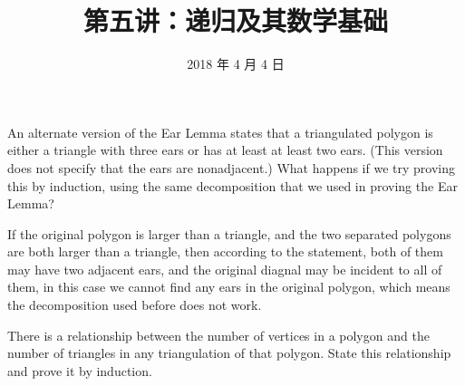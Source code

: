 \documentclass[11pt, a4paper, UTF8]{ctexart}
\title{第五讲：递归及其数学基础}
\date{2018 年 4 月 4 日}     %
\begin{document}
\maketitle
\noplagiarism	%
\beginthishw	%

\begin{problem}[CS: 4.1.16]	%
  An alternate version of the Ear Lemma states that a triangulated polygon 
  is either a triangle with three ears or has at least at least two ears.
  (This version does not specify that the ears are nonadjacent.) What happens 
  if we try proving this by induction, using the same decomposition that we 
  used in proving the Ear Lemma?
\end{problem}


\begin{solution}
  If the original polygon is larger than a triangle, and the two separated 
  polygons are both larger than a triangle, then according to the statement, 
  both of them may have two adjacent ears, and the original diagnal may be 
  incident to all of them, in this case we cannot find any ears in the original 
  polygon, which means the decomposition used before does not work.
\end{solution}

\begin{problem}[CS: 4.1.17]
  There is a relationship between the number of vertices in a polygon and 
  the number of triangles in any triangulation of that polygon. State this 
  relationship and prove it by induction.
\end{problem}
\end{document}
